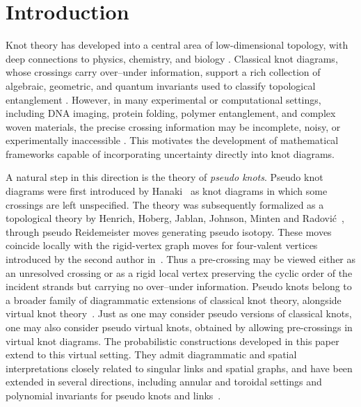 \documentclass[a4paper, reqno, 12pt]{amsart}
\theoremstyle{plain}
\theoremstyle{definition}
\begin{document}

\maketitle




\section{Introduction}\label{intro}

Knot theory has developed into a central area of low-dimensional topology, with deep connections to physics, chemistry, and biology \cites{A,B,F}. Classical knot diagrams, whose crossings carry over--under information, support a rich collection of algebraic, geometric, and quantum invariants used to classify topological entanglement \cites{Rolfsen,CrowellFox}. However, in many experimental or computational settings, including DNA imaging, protein folding, polymer entanglement, and complex woven materials, the precise crossing information may be incomplete, noisy, or
experimentally inaccessible \cites{B,WassermanCozzarelli1986,VirnauMirnyKardar2006,SumnersWhittington1988}. This motivates the development of mathematical frameworks capable of incorporating uncertainty directly into knot diagrams.

A natural step in this direction is the theory of \emph{pseudo knots}. Pseudo knot diagrams were first introduced by Hanaki~\cite{H} as knot diagrams in which some crossings are left unspecified. The theory was subsequently formalized as a topological theory by Henrich, Hoberg, Jablan, Johnson, Minten and Radovi\'c~\cite{HJMR}, through pseudo Reidemeister moves generating pseudo isotopy. These moves coincide locally with the rigid-vertex graph moves for four-valent vertices introduced by the second author in~\cite{Kauffman1989}. Thus a pre-crossing may be viewed either as an unresolved crossing or as a rigid local vertex preserving the cyclic order of the incident strands but carrying no over--under information. Pseudo knots belong to a broader family of diagrammatic extensions of classical knot theory, alongside virtual knot theory~\cites{LK2, D0}. Just as one may consider pseudo versions of classical knots, one may also consider pseudo virtual knots, obtained by allowing pre-crossings in virtual knot diagrams. The probabilistic constructions developed in this paper extend to this virtual setting. They admit diagrammatic and spatial interpretations closely related to singular links and spatial graphs, and have been extended in several directions, including annular and toroidal settings and polynomial invariants for pseudo knots and links~\cites{HD,BJW,D,D1,DLM3,DLM4}.
\end{document}
